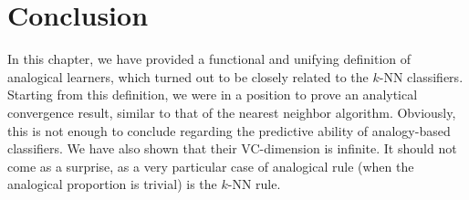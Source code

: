 %
%
%

\section*{Conclusion}

In this chapter, we have provided a functional and unifying definition of
analogical learners, which turned out to be closely related to the $k$-NN
classifiers. Starting from this definition, we were in a position to
prove an analytical convergence result, similar to that of the nearest neighbor
algorithm. Obviously, this is not enough to conclude regarding the predictive
ability of analogy-based classifiers. We have also shown that their
VC-dimension is infinite. It should not come as a surprise, as a very
particular case of analogical rule (when the analogical proportion is trivial)
is the $k$-NN rule.

